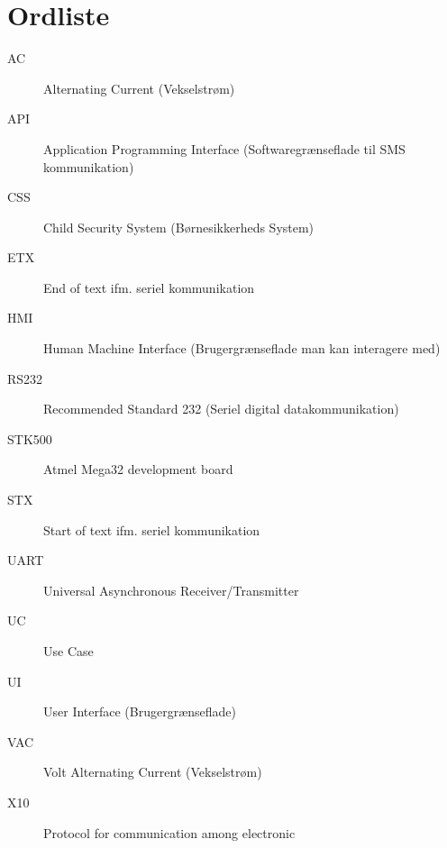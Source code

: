 \chapter{Ordliste}

\begin{description}

\item[AC] Alternating Current (Vekselstrøm)
\item[API] Application Programming Interface (Softwaregrænseflade til SMS kommunikation)
\item[CSS] Child Security System (Børnesikkerheds System)
\item[ETX] End of text ifm. seriel kommunikation
\item[HMI] Human Machine Interface (Brugergrænseflade man kan interagere med)
\item[RS232] Recommended Standard 232 (Seriel digital datakommunikation)
\item[STK500] Atmel Mega32 development board
\item[STX] Start of text ifm. seriel kommunikation
\item[UART] Universal Asynchronous Receiver/Transmitter
\item[UC] Use Case
\item[UI] User Interface (Brugergrænseflade)
\item[VAC] Volt Alternating Current (Vekselstrøm)
\item[X10] Protocol for communication among electronic

\end{description}